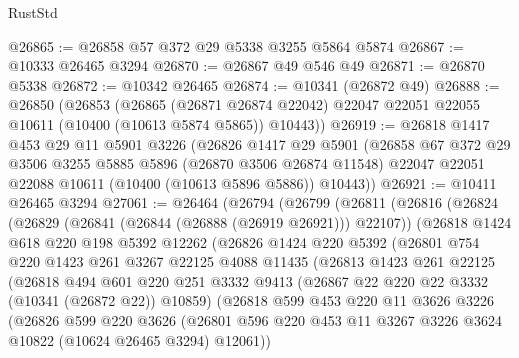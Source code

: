 \begin{lexlean}{RustStd}
\begin{coremodule}
@26865 := @26858 @57 @372 @29 @5338 @3255 @5864 @5874
@26867 := @10333 @26465 @3294
@26870 := @26867 @49 @546 @49
@26871 := @26870 @5338
@26872 := @10342 @26465
@26874 := @10341 (@26872 @49)
@26888 := @26850
    (@26853
      (@26865
        (@26871 @26874 @22042)
        @22047
        @22051
        @22055
        @10611
        (@10400 (@10613 @5874 @5865))
        @10443))
@26919 := @26818
    @1417
    @453
    @29
    @11
    @5901
    @3226
    (@26826
      @1417
      @29
      @5901
      (@26858
        @67
        @372
        @29
        @3506
        @3255
        @5885
        @5896
        (@26870 @3506 @26874 @11548)
        @22047
        @22051
        @22088
        @10611
        (@10400 (@10613 @5896 @5886))
        @10443))
@26921 := @10411 @26465 @3294
@27061 := @26464
    (@26794
      (@26799
        (@26811
          (@26816
            (@26824
              (@26829 (@26841 (@26844 (@26888 (@26919 @26921))) @22107))
              (@26818
                @1424
                @618
                @220
                @198
                @5392
                @12262
                (@26826
                  @1424
                  @220
                  @5392
                  (@26801
                    @754
                    @220
                    @1423
                    @261
                    @3267
                    @22125
                    @4088
                    @11435
                    (@26813
                      @1423
                      @261
                      @22125
                      (@26818
                        @494
                        @601
                        @220
                        @251
                        @3332
                        @9413
                        (@26867 @22 @220 @22 @3332 (@10341 (@26872 @22)) @10859)
                        (@26818
                          @599
                          @453
                          @220
                          @11
                          @3626
                          @3226
                          (@26826
                            @599
                            @220
                            @3626
                            (@26801
                              @596
                              @220
                              @453
                              @11
                              @3267
                              @3226
                              @3624
                              @10822
                              (@10624 @26465 @3294)
                              @12061))

\end{coremodule}
\end{lexlean}
